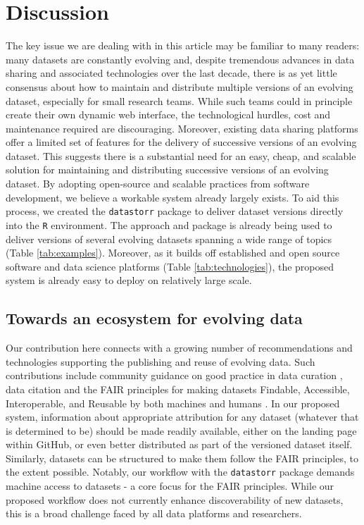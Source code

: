 \documentclass[a4paper,num-refs]{assets/oup-contemporary}
\begin{document}
\section{Discussion}

The key issue we are dealing with in this article may be familiar to many readers: many datasets are constantly evolving and, despite tremendous advances in data sharing and associated technologies over the last decade, there is as yet little consensus about how to maintain and distribute multiple versions of an evolving dataset, especially for small research teams. While such teams could in principle create their own dynamic web interface, the technological hurdles, cost and maintenance required are discouraging. Moreover, existing data sharing platforms offer a limited set of features for the delivery of successive versions of an evolving dataset. This suggests there is a substantial need for an easy, cheap, and scalable solution for maintaining and distributing successive versions of an evolving dataset. By adopting open-source and scalable practices from software development, we believe a workable system already largely exists. To aid this process, we created the \texttt{datastorr} package to deliver dataset versions directly into the \texttt{R} environment. The approach and package is already being used to deliver versions of several evolving datasets spanning a wide range of topics (Table \ref{tab:examples}). Moreover, as it builds off established and open source software and data science platforms (Table \ref{tab:technologies}), the proposed system is already easy to deploy on relatively large scale.

\subsection{Towards an ecosystem for evolving data}

Our contribution here connects with a growing number of recommendations and technologies supporting the publishing and reuse of evolving data. Such contributions include community guidance on good practice in data curation \cite{Goodman-2014, Lowndes-2017}, data citation \cite{Force11-2014} and the FAIR principles for making datasets Findable, Accessible, Interoperable, and Reusable by both machines and humans \cite{Wilkinson-2016}. In our proposed system, information about appropriate attribution for any dataset  (whatever that is determined to be) should be made readily available, either on the landing page within GitHub, or even better distributed as part of the versioned dataset itself. Similarly, datasets can be structured to make them follow the FAIR principles, to the extent possible. Notably, our workflow with the \texttt{datastorr} package demands machine access to datasets - a core focus for the FAIR principles. While our proposed workflow does not currently enhance discoverability of new datasets, this is a broad challenge faced by all data platforms and researchers.
\end{document}
